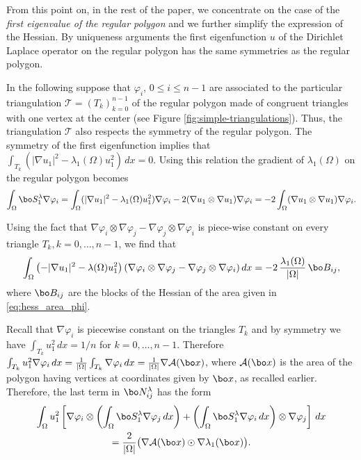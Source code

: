 From this point on, in the rest of the paper, we concentrate on the case of the \emph{first eigenvalue of the regular polygon} and we further simplify the expression of the Hessian. By uniqueness arguments the first eigenfunction $u$ of the Dirichlet Laplace operator on the regular polygon has the same symmetries as the regular polygon.

In the following suppose that $\varphi_i$, $0 \leq i \leq n-1$ are associated to the particular triangulation $\mathcal T=(T_k)_{k=0}^{n-1}$ of the regular polygon made of congruent triangles with one vertex at the center (see Figure \ref{fig:simple-triangulations}). Thus, the triangulation $\mathcal T$ also respects the symmetry of the regular polygon. The symmetry of the first eigenfunction implies that $\int_{T_k}(|\nabla u_1|^2-\lambda_1(\Omega) u_1^2)\, dx=0$. Using this relation the gradient of $\lambda_1(\Omega)$ on the regular polygon becomes
\[
\int_\Omega \bo S_1^\lambda \nabla \varphi_i = \int_\Omega (|\nabla u_1|^2-\lambda_1(\Omega) u_1^2)\nabla \varphi_i - 2 (\nabla u_1 \otimes \nabla u_1) \nabla \varphi_i = -2 \int_\Omega (\nabla u_1 \otimes \nabla u_1) \nabla \varphi_i.
\]

Using the fact that $\nabla \varphi_i \otimes \nabla \varphi_j-\nabla \varphi_j \otimes \nabla \varphi_i$ is piece-wise constant on every triangle $T_k, k=0,\dots,n-1$, we find that
\[
\int_\Omega \left(-|\nabla u_1|^2-\lambda(\Omega) u_1^2\right) (\nabla \varphi_i \otimes \nabla \varphi_j-\nabla \varphi_j \otimes \nabla \varphi_i) \, dx = -2\,\frac{\lambda_1(\Omega)}{|\Omega|}\, \bo B_{ij},
\]
where $\bo B_{ij}$ are the blocks of the Hessian of the area given in \eqref{eq:hess_area_phi}.

Recall that $\nabla \varphi_i$ is piecewise constant on the triangles $T_k$ and by symmetry we have $\int_{T_k} u_1^2\, dx = 1/n$ for $k=0,\dots,n-1$. Therefore $\int_{T_k} u_1^2 \nabla \varphi_i\, dx = \frac{1}{|\Omega|} \int_{T_k}\nabla \varphi_i\, dx=\frac{1}{|\Omega|} \nabla \mathcal A(\bo x)$, where $\mathcal A(\bo x)$ is the area of the polygon having vertices at coordinates given by $\bo x$, as recalled earlier. Therefore, the last term in $\bo N_{ij}^\lambda$ has the form
\vspace*{-5pt}
\begin{multline*}
\int_\Omega u_1^2\left[\nabla \varphi_i \otimes \left(\int_\Omega \bo S_1^\lambda \nabla \varphi_j\, dx \right)+
\left(\int_\Omega \bo S_1^\lambda \nabla \varphi_i\, dx \right)\otimes \nabla \varphi_j \right]\, dx \\
= \frac{2}{|\Omega|} \bigl(\nabla \mathcal A(\bo x) \odot \nabla \lambda_1(\bo x)\bigr).
\end{multline*}

